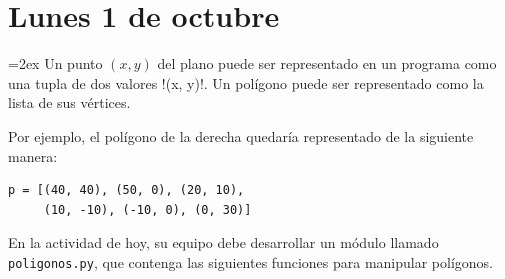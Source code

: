 \documentclass[12pt,spanish]{article}
\begin{document}
  \thispagestyle{empty}
  \pagestyle{empty}
  \section*{Lunes 1 de octubre}


  \begin{minipage}[T]{0.7\textwidth}
    \parskip=2ex
    Un punto \((x, y)\) del plano
    puede ser representado en un programa
    como una tupla de dos valores \li!(x, y)!.
    Un polígono puede ser representado como la lista de sus vértices.

    Por ejemplo,
    el polígono de la derecha
    quedaría representado de la siguiente manera:
    \begin{lstlisting}
p = [(40, 40), (50, 0), (20, 10),
     (10, -10), (-10, 0), (0, 30)]
    \end{lstlisting}
  \end{minipage}
  \hfill
  \begin{minipage}[T]{0.25\textwidth}
  \end{minipage}

  En la actividad de hoy,
  su equipo debe desarrollar un módulo llamado \texttt{poligonos.py},
  que contenga las siguientes funciones para manipular polígonos.
\end{document}
